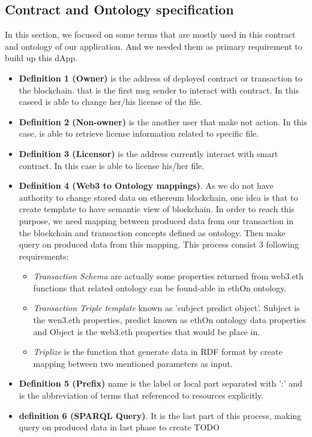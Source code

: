 \subsection{Contract and Ontology specification}
In this section, we focused on some terms that are mostly used in this contract and ontology of our application. And we needed them as primary requirement to build up this dApp.
\begin{itemize}
	\item \textbf{Definition 1 (Owner)} is the address of deployed contract or transaction to the blockchain. that is the first msg sender to interact with contract. In this caseed is able to change her/his license of the file.\\
	\item \textbf{Definition 2 (Non-owner)} is the another user that make not action. In this case, is able to retrieve license information related to specific file.\\
	\item \textbf{Definition 3 (Licensor)}  is the address currently interact with smart contract. In this case is able to license his/her file.\\ 
	\item \textbf{Definition 4 (Web3 to Ontology mappings)}. As we do not have authority to change stored data on ethereum blockchain, one idea is that to create template to have semantic view of blockchain.
	In order to reach this purpose, we need mapping between produced data from our transaction in the blockchain and transaction concepts defined as ontology. Then make query on produced data from this mapping. This process consist 3 following requirements:
	
	\begin{itemize}
		\item \textit{Transaction Schema} are actually some properties returned from web3.eth functions that related ontology can be found-able in ethOn ontology.
		\item \textit{Transaction Triple template} known as 'subject predict object'. Subject is the wen3.eth properties, predict known as ethOn ontology data properties and Object is the web3.eth properties that would be place in. 
		\item \textit{Triplize} is the function that generate data in RDF format by create mapping between two mentioned parameters as input. 
	\end{itemize} 
    \item \textbf{Definition 5 (Prefix)} name is the label or local part separated with ':' and is the abbreviation of terms that referenced to resources explicitly. \\  
	\item \textbf{definition 6 (SPARQL Query)}. It is the last part of this process, making query on produced data in last phase to create TODO  
\end{itemize}

